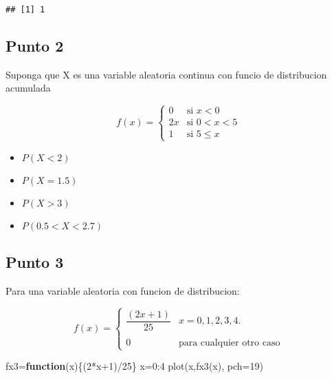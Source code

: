 \documentclass[
]{article}
\newenvironment{Shaded}{\begin{snugshade}}{\end{snugshade}}
\newcommand{\AttributeTok}[1]{\textcolor[rgb]{0.77,0.63,0.00}{#1}}
\newcommand{\ControlFlowTok}[1]{\textcolor[rgb]{0.13,0.29,0.53}{\textbf{#1}}}
\newcommand{\DecValTok}[1]{\textcolor[rgb]{0.00,0.00,0.81}{#1}}
\newcommand{\FunctionTok}[1]{\textcolor[rgb]{0.00,0.00,0.00}{#1}}
\newcommand{\NormalTok}[1]{#1}
\newcommand{\OtherTok}[1]{\textcolor[rgb]{0.56,0.35,0.01}{#1}}
\newcommand{\SpecialCharTok}[1]{\textcolor[rgb]{0.00,0.00,0.00}{#1}}
\begin{document}
\begin{verbatim}
## [1] 1
\end{verbatim}

\hypertarget{punto-2}{%
\subsection{Punto 2}\label{punto-2}}

Suponga que X es una variable aleatoria continua con funcio de
distribucion acumulada

\[f(x)=\left\{\begin{matrix}0&\mbox{si }x<0\\ 2x & \mbox{si } 0 < x < 5 \\ 
                      1  & \mbox{si } 5 \leq x  \end{matrix}\right. \]

\begin{itemize}
\item
  \(P(X < 2)\)
\item
  \(P(X = 1.5)\)
\item
  \(P( X > 3)\)
\item
  \(P(0.5 < X <2.7)\)
\end{itemize}

\hypertarget{punto-3}{%
\subsection{Punto 3}\label{punto-3}}

Para una variable aleatoria con funcion de distribucion:

\[f(x)=\left\{\begin{matrix}\dfrac{(2x+1)}{25}& x=0,1,2,3,4.\\ & \\
 0 & \mbox{para cualquier otro caso} \end{matrix}\right.\]

\begin{Shaded}
\begin{Highlighting}[]
\NormalTok{fx3}\OtherTok{=}\ControlFlowTok{function}\NormalTok{(x)\{(}\DecValTok{2}\SpecialCharTok{*}\NormalTok{x}\SpecialCharTok{+}\DecValTok{1}\NormalTok{)}\SpecialCharTok{/}\DecValTok{25}\NormalTok{\}}
\NormalTok{x}\OtherTok{=}\DecValTok{0}\SpecialCharTok{:}\DecValTok{4}
\FunctionTok{plot}\NormalTok{(x,}\FunctionTok{fx3}\NormalTok{(x), }\AttributeTok{pch=}\DecValTok{19}\NormalTok{)}
\end{Highlighting}
\end{Shaded}
\end{document}
